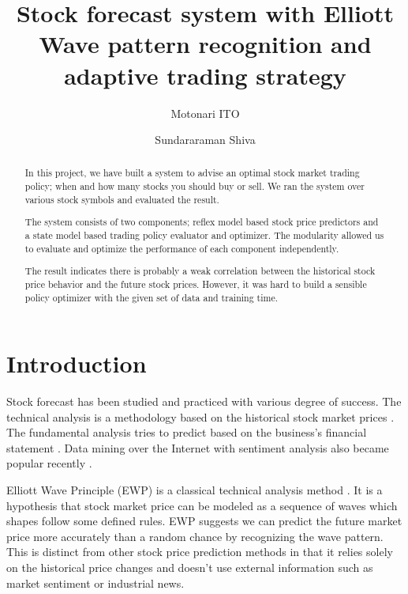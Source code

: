 \documentclass[twocolumn,10pt]{asme2ej}
\begin{document}
\title{Stock forecast system with Elliott Wave pattern recognition and adaptive trading strategy}
\author{Motonari ITO
}

\author{Sundararaman Shiva
}

\maketitle

\begin{abstract}
  In this project, we have built a system to advise an optimal stock market
  trading policy; when and how many stocks you should buy or sell. We ran the
  system over various stock symbols and evaluated the result.

  The system consists of two components; reflex model based stock price
  predictors and a state model based trading policy evaluator and optimizer. The
  modularity allowed us to evaluate and optimize the performance of each
  component independently.
  
  The result indicates there is probably a weak correlation between the
  historical stock price behavior and the future stock prices. However, it was
  hard to build a sensible policy optimizer with the given set of data and
  training time.
\end{abstract}

\section{Introduction}

Stock forecast has been studied and practiced with various degree of
success. The technical analysis is a methodology based on the
historical stock market prices \cite{wiki:technical_analysis}. The
fundamental analysis tries to predict based on the business's
financial statement \cite{wiki:fundamental_analysis}. Data mining over
the Internet with sentiment analysis also became popular recently
\cite{web:data_mining_analysis}.

Elliott Wave Principle (EWP) is a classical technical analysis method
\cite{frost1981elliott, web:study_of_cycles}. It is a hypothesis that stock
market price can be modeled as a sequence of waves which shapes follow some
defined rules. EWP suggests we can predict the future market price more
accurately than a random chance by recognizing the wave pattern.  This is
distinct from other stock price prediction methods in that it relies solely on
the historical price changes and doesn't use external information such as market
sentiment or industrial news.
\end{document}

